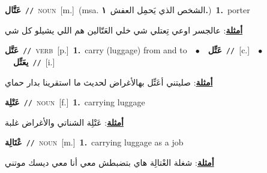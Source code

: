 \documentclass[10pt,a4paper,twoside]{article} %
\begin{document}
\begin{multicols}{2}
{\setlength\topsep{0pt}\textbf{\foreignlanguage{arabic}{عَتَّال}}\ {\color{gray}\texttt{//}\color{black}}\ \textsc{noun}\ [m.]\ \color{gray}(msa. \foreignlanguage{arabic}{الشخص الذي يَحمِل العفش}~\foreignlanguage{arabic}{\textbf{١.}})\color{black}\ \textbf{1.}~porter\  \begin{flushright}\color{gray}\foreignlanguage{arabic}{\textbf{\underline{\foreignlanguage{arabic}{أمثلة}}}: عالجسر اوعي تِعتلي شي خلي العَتّالين هم اللي يشيلو كل شي}\end{flushright}\color{black}} \vspace{2mm}

{\setlength\topsep{0pt}\textbf{\foreignlanguage{arabic}{عَتَّل}}\ {\color{gray}\texttt{//}\color{black}}\ \textsc{verb}\ [p.]\ \textbf{1.}~carry (luggage) from and to\ \ $\bullet$\ \ \setlength\topsep{0pt}\textbf{\foreignlanguage{arabic}{عَتِّل}}\ {\color{gray}\texttt{//}\color{black}}\ [c.]\ \ $\bullet$\ \ \setlength\topsep{0pt}\textbf{\foreignlanguage{arabic}{يعَتِّل}}\ {\color{gray}\texttt{//}\color{black}}\ [i.]\  \begin{flushright}\color{gray}\foreignlanguage{arabic}{\textbf{\underline{\foreignlanguage{arabic}{أمثلة}}}: صليتني أعَتِّل بهالأغراض لحديث ما استقرينا بدار  حماي}\end{flushright}\color{black}} \vspace{2mm}

{\setlength\topsep{0pt}\textbf{\foreignlanguage{arabic}{عَتْلِة}}\ {\color{gray}\texttt{//}\color{black}}\ \textsc{noun}\ [f.]\ \textbf{1.}~carrying luggage\  \begin{flushright}\color{gray}\foreignlanguage{arabic}{\textbf{\underline{\foreignlanguage{arabic}{أمثلة}}}: عَتْلِة الشناتي والأغراض غلبة}\end{flushright}\color{black}} \vspace{2mm}

{\setlength\topsep{0pt}\textbf{\foreignlanguage{arabic}{عْتَالِة}}\ {\color{gray}\texttt{//}\color{black}}\ \textsc{noun}\ [m.]\ \textbf{1.}~carrying luggage as a job\  \begin{flushright}\color{gray}\foreignlanguage{arabic}{\textbf{\underline{\foreignlanguage{arabic}{أمثلة}}}: شغلة العْتالِة هاي بتضبطش معي أنا معي ديسك موتني}\end{flushright}\color{black}} \vspace{2mm}


\end{multicols}
\end{document}
